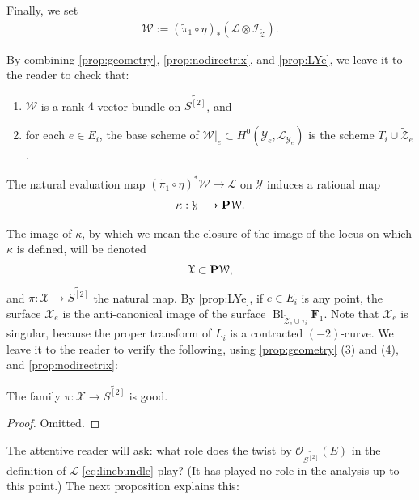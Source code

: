 \documentclass[12pt,reqno]{amsart}
\DeclareMathOperator{\Bl}{Bl}
\renewcommand{\to}{{\longrightarrow}}
\numberwithin{equation}{section}
\renewcommand{\O}{\mathcal O}
\newcommand{\F}{\mathbf F}
\newcommand{\td}{\widetilde}
\begin{document}
Finally, we set
\begin{align}
  \label{eq:V4}
  \mathcal{W} := (\td{\pi}_{1} \circ \eta)_{*}\left(\mathcal{L} \otimes \mathcal{I}_{\td{\mathcal{Z}}}\right).
\end{align}

By combining \autoref{prop:geometry}, \autoref{prop:nodirectrix}, and
\autoref{prop:LYe}, we leave it to the reader to check that:

\begin{enumerate}\label{propertieskappa}
\item $\mathcal{W}$ is a rank $4$ vector bundle on $\td{S^{[2]}}$, and
\item for each $e \in E_{i}$, the base scheme of
  $\mathcal{W}|_{e} \subset
  H^{0}\left(\mathcal{Y}_{e},\mathcal{L}_{\mathcal{Y}_{e}}\right)$ is
  the scheme $T_{i} \cup \td{\mathcal{Z}}_{e}$.
\end{enumerate}

The natural evaluation map
$(\td{\pi}_{1} \circ \eta)^{*}\mathcal{W} \to \mathcal{L}$ on
$\mathcal{Y}$ induces a rational map
\begin{align}
  \label{eq:kappa4}
  \kappa: \mathcal{Y} \dashrightarrow \P \mathcal{W}.
\end{align}

The image of $\kappa$, by which we mean the closure of the image of
the locus on which $\kappa$ is defined, will be denoted
\[\mathcal{X} \subset \P \mathcal{W}, \] and $\pi: \mathcal{X} \to \td{S^{[2]}}$ the natural map. By \autoref{prop:LYe}, if
$e \in E_{i}$ is any point, the surface $\mathcal{X}_{e}$ is the
anti-canonical image of the surface
$\Bl_{\td{\mathcal{Z}}_{e} \cup \tau_{i}} \F_{1}$.  Note that
$\mathcal{X}_{e}$ is singular, because the proper transform of $L_{i}$
is a contracted $(-2)$-curve. We leave it to the reader to verify the
following, using \autoref{prop:geometry} (3) and (4), and
\autoref{prop:nodirectrix}:

\begin{proposition}
  \label{prop:good4} The family $\pi: \mathcal{X} \to \td{S^{[2]}}$ is
  good.
\end{proposition}

\begin{proof}
  Omitted.
\end{proof}

The attentive reader will ask: what role does the twist by
$\O_{\td{S^{[2]}}}(E)$ in the definition of $\mathcal{L}$
\eqref{eq:linebundle} play? (It has played no role in the analysis up
to this point.)  The next proposition explains this:
\end{document}

